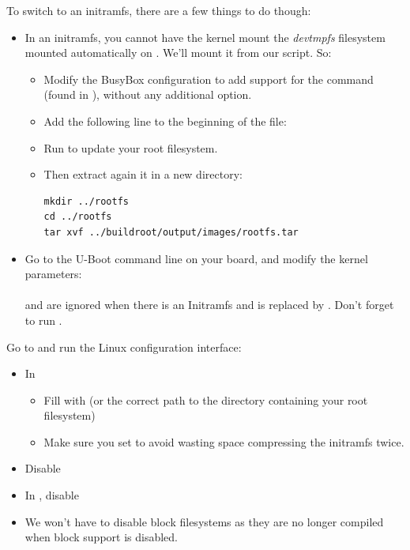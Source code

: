 To switch to an initramfs, there are a few things to do though:
\begin{itemize}
\item In an initramfs, you cannot have the kernel mount the {\em
devtmpfs} filesystem mounted automatically on . We'll mount
it from our  script.
So:
   \begin{itemize}
   \item Modify the BusyBox configuration to add support for the
    command (found in ), without
    any additional option.
   \item Add the following line to the beginning of the  file:\\
   \item Run  to update your root filesystem.
   \item Then extract again it in a new  directory:
\begin{verbatim}
mkdir ../rootfs
cd ../rootfs
tar xvf ../buildroot/output/images/rootfs.tar
\end{verbatim}
   \end{itemize}
\item Go to the U-Boot command line on your board, and modify the
kernel parameters:\\
   \\
    and  are ignored when there is an
   Initramfs and  is replaced by .
   Don't forget to run .
\end{itemize}

Go to  and run the Linux
configuration interface:

\begin{itemize}
  \item In 
  \begin{itemize}
     \item Fill  with
 (or the correct path to the directory
containing your root filesystem)
     \item Make sure you set 
	   to avoid wasting space compressing the initramfs twice.
  \end{itemize}
  \item Disable 
  \item In , disable 
  \item We won't have to disable block filesystems as they are no longer
compiled when block support is disabled.
\end{itemize}

